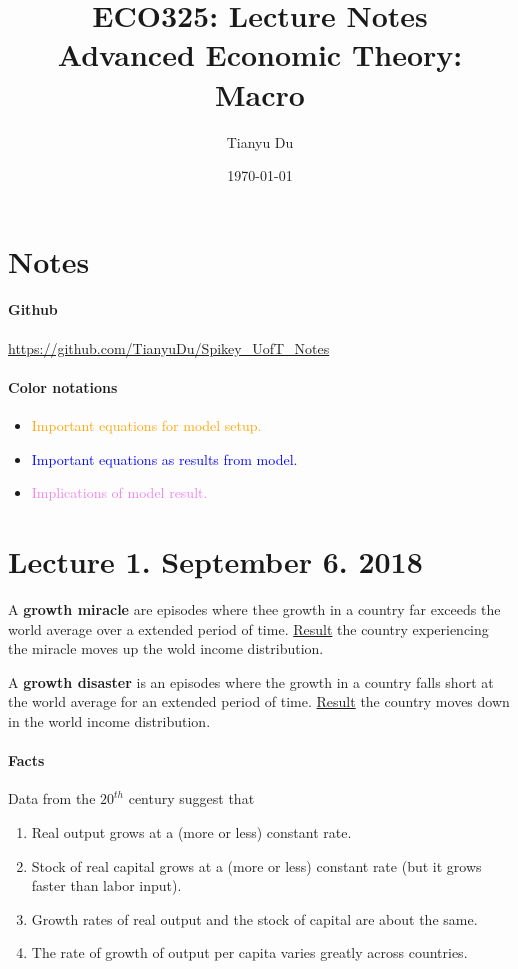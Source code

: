 \documentclass[]{article}
\title{ECO325: Lecture Notes \\ \small Advanced Economic Theory: Macro}
\author{Tianyu Du}
\date{\today}
\begin{document}
    \maketitle
    \doclicenseThis
    \section*{Notes}
    	\paragraph{Github} \url{https://github.com/TianyuDu/Spikey_UofT_Notes}
    	\paragraph{Color notations}
    		\begin{itemize}
    			\item \textcolor{orange}{Important equations for model setup.}
    			\item \textcolor{blue}{Important equations as results from model.}
    			\item \textcolor{violet}{Implications of model result.}
    		\end{itemize}
    \tableofcontents
    \newpage
    
    \section{Lecture 1. September 6. 2018}
        \begin{definition}
            A \textbf{growth miracle} are episodes where thee growth in a country far exceeds the world average over a extended period of time. \ul{Result} the country experiencing the miracle moves up the wold income distribution.
        \end{definition}
        
        \begin{definition}
            A \textbf{growth disaster} is an episodes where the growth in a country falls short at the world average for an extended period of time. \ul{Result} the country moves down in the world income distribution.
        \end{definition}
    
        \paragraph{Facts} Data from the $20^{th}$ century suggest that
        \begin{enumerate}
            \item Real output grows at a (more or less) constant rate.
            \item Stock of real capital grows at a (more or less) constant rate (but it grows faster than labor input).
            \item Growth rates of real output and the stock of capital are about the same.
            \item The rate of growth of output per capita varies greatly across countries.
        \end{enumerate}
        
\end{document}
